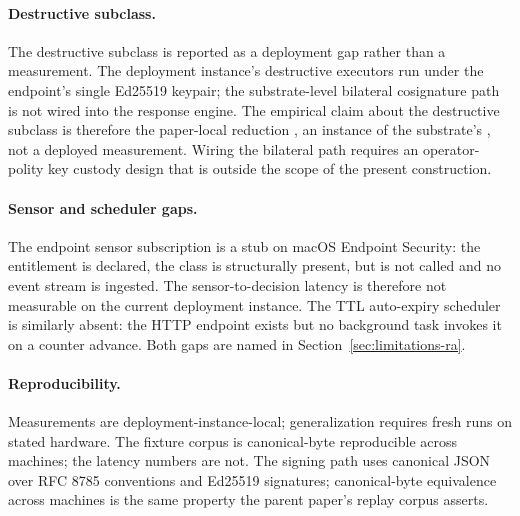 \paragraph{Destructive subclass.}
The destructive subclass is reported as a deployment gap rather than
a measurement. The deployment instance's destructive executors run
under the endpoint's single Ed25519 keypair; the substrate-level
bilateral cosignature path is not wired into the response engine. The
empirical claim about the destructive subclass is therefore the
paper-local reduction
, an instance of
the substrate's , not
a deployed measurement. Wiring the bilateral path requires an
operator-polity key custody design that is outside the scope of the
present construction.

\paragraph{Sensor and scheduler gaps.}
The endpoint sensor subscription is a stub on macOS Endpoint Security:
the entitlement is declared, the class is structurally present, but
 is not called and no event stream is
ingested. The sensor-to-decision latency is therefore not measurable
on the current deployment instance. The TTL auto-expiry scheduler is
similarly absent: the  HTTP endpoint exists but no
background task invokes it on a counter advance. Both gaps are named
in Section~\ref{sec:limitations-ra}.

\paragraph{Reproducibility.}
Measurements are deployment-instance-local; generalization requires
fresh runs on stated hardware. The fixture corpus is canonical-byte
reproducible across machines; the latency numbers are not. The signing
path uses canonical JSON over RFC 8785 conventions and Ed25519
signatures; canonical-byte equivalence across machines is the same
property the parent paper's replay corpus asserts.
